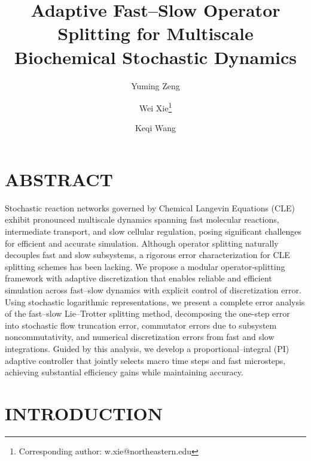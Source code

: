 \documentclass{article}
\begin{document}
\title{\Large 
Adaptive 
Fast–Slow Operator Splitting for Multiscale Biochemical Stochastic Dynamics
}

\author[1]{Yuming Zeng}
\author[  ~,1]{Wei Xie\thanks{Corresponding author: w.xie@northeastern.edu}}
\author[1]{Keqi Wang}



\maketitle


\section*{ABSTRACT}
Stochastic reaction networks governed by Chemical Langevin Equations (CLE) exhibit pronounced multiscale dynamics spanning fast molecular reactions, intermediate transport, and slow cellular regulation, posing significant challenges for efficient and accurate simulation. Although operator splitting naturally decouples fast and slow subsystems, a rigorous error characterization for CLE splitting schemes has been lacking. We propose a modular operator‑splitting framework with adaptive discretization that enables reliable and efficient simulation across fast–slow dynamics with explicit control of discretization error. Using stochastic logarithmic representations, we present a complete error analysis of the fast–slow Lie–Trotter splitting method, decomposing the one-step error into stochastic flow truncation error, commutator errors due to subsystem noncommutativity, and numerical discretization errors from 
fast and slow integrations. Guided by this analysis, we develop a proportional–integral (PI) adaptive controller that jointly selects macro time steps and fast microsteps, achieving substantial efficiency gains while maintaining accuracy.


\section{INTRODUCTION}

\end{document}
